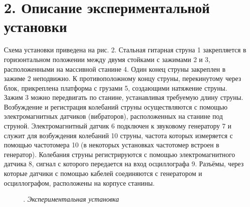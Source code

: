 \documentclass[a4paper]{article}
\begin{document}
\section*{2. Описание экспериментальной установки}
Схема установки приведена на рис. 2. Стальная гитарная струна 1 закрепляется в горизонтальном положении между двумя стойками с зажимами 2 и 3, расположенными на массивной станине 4. Один конец струны
закреплен в зажиме 2 неподвижно. К противоположному концу струны, перекинутому через блок, прикреплена платформа с грузами 5, создающими
натяжение струны. Зажим 3 можно передвигать по станине, устанавливая
требуемую длину струны. Возбуждение и регистрация колебаний струны
осуществляются с помощью электромагнитных датчиков (вибраторов),
расположенных на станине под струной. Электромагнитный датчик 6 подключен к звуковому генератору 7 и служит для возбуждения колебаний
10
струны, частота которых измеряется с помощью частотомера 10 (в некоторых установках частотомер встроен в генератор). Колебания струны регистрируются с помощью электромагнитного датчика 8, сигнал с которого
передается на вход осциллографа 9. Разъёмы, через которые датчики с помощью кабелей соединяются с генератором и осциллографом, расположены на корпусе станины.
\begin{figure}
\caption{. \textit{Экспериментальная установка}}
\end{figure}
\end{document}
